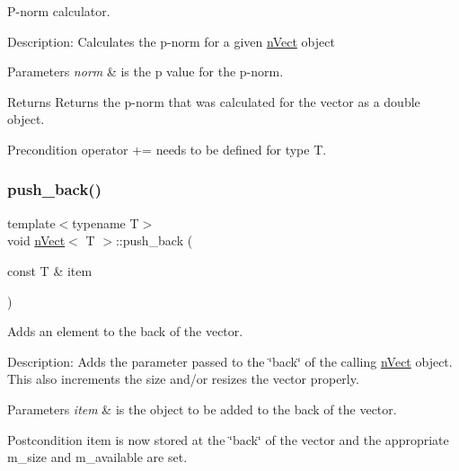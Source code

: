 P-\/norm calculator. 

Description\+: Calculates the p-\/norm for a given \hyperlink{classnVect}{n\+Vect} object 
\begin{DoxyParams}{Parameters}
{\em norm} & is the p value for the p-\/norm. \\
\hline
\end{DoxyParams}
\begin{DoxyReturn}{Returns}
Returns the p-\/norm that was calculated for the vector as a double object. 
\end{DoxyReturn}
\begin{DoxyPrecond}{Precondition}
operator += needs to be defined for type T. 
\end{DoxyPrecond}
\mbox{\label{classnVect_aac4b9c9287c14f0957f46eec00f17e62}} 
\subsubsection{\texorpdfstring{push\+\_\+back()}{push\_back()}}
{\footnotesize\ttfamily template$<$typename T$>$ \\
void \hyperlink{classnVect}{n\+Vect}$<$ T $>$\+::push\+\_\+back (\begin{DoxyParamCaption}\item[{const T \&}]{item }\end{DoxyParamCaption})}



Adds an element to the back of the vector. 

Description\+: Adds the parameter passed to the \char`\"{}back\char`\"{} of the calling \hyperlink{classnVect}{n\+Vect} object. This also increments the size and/or resizes the vector properly. 
\begin{DoxyParams}{Parameters}
{\em item} & is the object to be added to the back of the vector. \\
\hline
\end{DoxyParams}
\begin{DoxyPostcond}{Postcondition}
item is now stored at the \char`\"{}back\char`\"{} of the vector and the appropriate m\+\_\+size and m\+\_\+available are set. 
\end{DoxyPostcond}
\mbox{\label{classnVect_ae12cfca2171f96e7c792ae709745c298}} 
